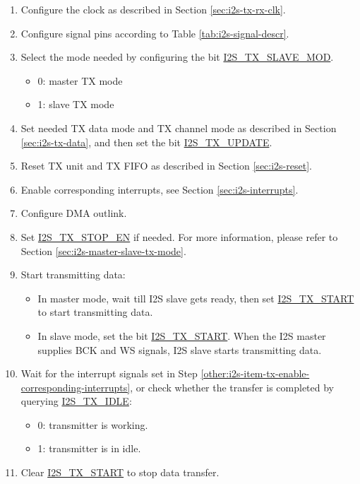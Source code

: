\documentclass[main\_\_EN.tex]{subfiles}
\begin{document}
\begin{enumerate}
    \item Configure the clock as described in Section \ref{sec:i2s-tx-rx-clk}.

    \item Configure signal pins according to Table \ref{tab:i2s-signal-descr}.
    
    \item Select the mode needed by configuring the bit \hyperref[fielddesc:I2STXSLAVEMOD]{I2S\_TX\_SLAVE\_MOD}.
    \begin{itemize}
        \item 0: master TX mode
        \item 1: slave TX mode
    \end{itemize}
   
    \item Set needed TX data mode and TX channel mode as described in Section \ref{sec:i2s-tx-data}, and then set the bit \hyperref[fielddesc:I2STXUPDATE]{I2S\_TX\_UPDATE}.

    \item Reset TX unit and TX FIFO as described in Section \ref{sec:i2s-reset}.
    \item Enable corresponding interrupts, see Section \ref{sec:i2s-interrupts}.\label{other:i2s-item-tx-enable-corresponding-interrupts}
    
    \item Configure DMA outlink. 
    
    \item Set \hyperref[fielddesc:I2STXSTOPEN]{I2S\_TX\_STOP\_EN} if needed. For more information, please refer to Section \ref{sec:i2s-master-slave-tx-mode}. 

    \item Start transmitting data:
    \begin{itemize}
        \item In master mode, wait till I2S slave gets ready, then set \hyperref[fielddesc:I2STXSTART]{I2S\_TX\_START} to start transmitting data.
        \item In slave mode, set the bit \hyperref[fielddesc:I2STXSTART]{I2S\_TX\_START}. When the I2S master supplies BCK and WS signals, I2S slave starts transmitting data.
    \end{itemize}

    \item Wait for the interrupt signals set in Step \ref{other:i2s-item-tx-enable-corresponding-interrupts}, or check whether the transfer is completed by querying \hyperref[fielddesc:I2STXIDLE]{I2S\_TX\_IDLE}:
    \begin{itemize}
        \item 0: transmitter is working.
        \item 1: transmitter is in idle.
    \end{itemize}
    
    \item Clear \hyperref[fielddesc:I2STXSTART]{I2S\_TX\_START} to stop data transfer.
\end{enumerate}
\end{document}
